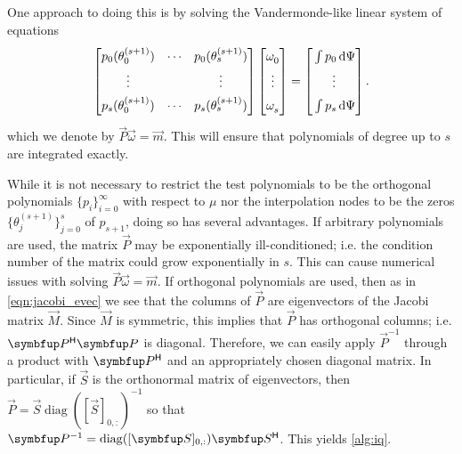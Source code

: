 One approach to doing this is by solving the Vandermonde-like linear system of equations%
\begin{equation}
    \label{eqn:vandermonde}
    \begin{bmatrix}
        \vphantom{\Big(} 
        p_0(\theta_{0}^{(s+1)}) & \cdots & p_0 (\theta_{s}^{(s+1)}) \\
        \vphantom{\Big(} 
        \vdots & & \vdots \\
        \vphantom{\Big(} 
        p_{s}(\theta_{0}^{(s+1)}) & \cdots & p_{s}(\theta_{s}^{(s+1)}) \\
    \end{bmatrix}
    \begin{bmatrix}
        \vphantom{\Big(}\omega_{0}^{} \\ 
        \vphantom{\Big(} 
        \vdots \\ \vphantom{\Big(} \omega_{s}^{}
    \end{bmatrix}
    =
    \begin{bmatrix}
        \vphantom{\Big(} \int p_0 \,\textup{d}\Psi \\ 
        \vphantom{\Big(} 
        \vdots \\ \vphantom{\Big(} \int p_{s} \,\textup{d}\Psi
    \end{bmatrix}.
\end{equation}
which we denote by \( \vec{P} \vec{\omega} = \vec{m} \). 
This will ensure that polynomials of degree up to \( s \) are integrated exactly. 

While it is not necessary to restrict the test polynomials to be the orthogonal polynomials \( \{ p_i \}_{i=0}^{\infty} \) with respect to \( \mu \) nor the interpolation nodes to be the zeros \( \{ \theta_j^{(s+1)} \}_{j=0}^{s} \) of \( p_{s+1} \), doing so has several advantages.
If arbitrary polynomials are used, the matrix \( \vec{P} \) may be exponentially ill-conditioned; i.e. the condition number of the matrix could grow exponentially in \( s \).
This can cause numerical issues with solving \( \vec{P} \vec{\omega} = \vec{m} \).
If orthogonal polynomials are used, then as in \cref{eqn:jacobi_evec} we see that the columns of \( \vec{P} \) are eigenvectors of the Jacobi matrix \( \vec{M} \).
Since \( \vec{M} \) is symmetric, this implies that \( \vec{P} \) has orthogonal columns; i.e. \( \vec{P}^\cT\vec{P} \) is diagonal.
Therefore, we can easily apply \( \vec{P}^{-1} \) through a product with \( \vec{P}^\cT \) and an appropriately chosen diagonal matrix.
In particular, if \( \vec{S} \) is the orthonormal matrix of eigenvectors, then \( \vec{P} = \vec{S} \operatorname{diag}([\vec{S}]_{0,:})^{-1} \) so that \( \vec{P}^{-1} = \operatorname{diag}([\vec{S}]_{0,:})\vec{S}^\cT \).
This yields \cref{alg:iq}.

